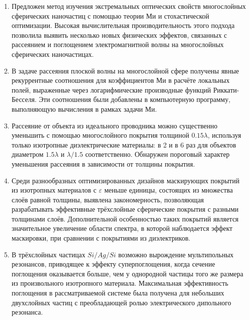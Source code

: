 \begin{enumerate}
  \item Предложен метод изучения экстремальных оптических свойств
    многослойных сферических наночастиц с помощью теории Ми и
    стохастической оптимизации. Высокая вычислительная
    производительность этого подхода позволила выявить несколько новых
    физических эффектов, связанных с рассеянием и поглощением
    электромагнитной волны на многослойных сферических наночастицах.
  \item В задаче рассеяния плоской волны на многослойной сфере
    получены явные рекуррентные соотношения для коэффициентов Ми в
    расчёте локальных полей, выраженные через логарифмические
    производные функций Риккати-Бесселя.  Эти соотношения были
    добавлены в компьютерную программу, выполняющую вычисления в
    рамках задачи Ми.
  \item Рассеяние от объекта из идеального проводника можно
    существенно уменьшить с помощью многослойного покрытия толщиной
    $0.15\lambda$, используя только изотропные диэлектрические
    материалы: в 2 и в 6 раз для объектов диаметром $1.5\lambda$ и
    $\lambda/1.5$ соответственно. Обнаружен пороговый характер
    уменьшения рассеяния в зависимости от толщины покрытия.
  \item %
    Среди разнообразных оптимизированных дизайнов маскирующих покрытий из
    изотропных материалов с $\varepsilon$ меньше единицы, состоящих из
    множества слоёв равной толщины, выявлена закономерность,
    позволяющая разрабатывать эффективные трёхслойные сферические
    покрытия с разными толщинами слоёв. Дополнительной особенностью
    таких покрытий является значительное увеличение области спектра, в
    которой наблюдается эффект маскировки, при сравнении с покрытиями
    из диэлектриков. 
  \item В трёхслойных частицах $Si/Ag/Si$ возможно вырождение
    мультипольных резонансов, приводящее к эффекту суперпоглощения,
    когда сечение поглощения оказывается больше, чем у однородной
    частицы того же размера из произвольного изотропного
    материала. Максимальная эффективность поглощения в
    рассматриваемой системе была получена для небольших двухслойных
    частиц с преобладающей ролью электрического дипольного резонанса.
\end{enumerate}
